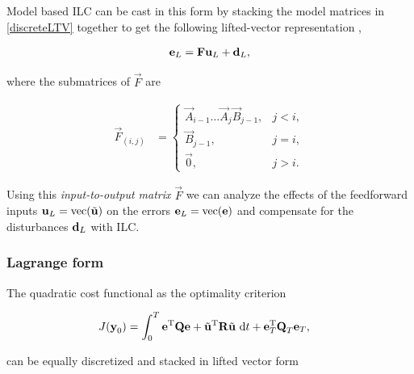\noindent Model based ILC can be cast in this form by stacking the model matrices in \eqref{discreteLTV} together to get the following lifted-vector representation \cite{Bristow06}, \cite{Schoellig12}

\begin{equation}
\begin{aligned}
\boldsymbol{\mathrm{e}}_L &= \boldsymbol{\mathrm{F}}\boldsymbol{\mathrm{u}}_L + \boldsymbol{\mathrm{d}}_L, \\
\end{aligned}
\label{liftedLTV}
\end{equation}

\noindent where the submatrices of $\vec{F}$ are

\begin{equation*}
\begin{aligned}
\vec{F}_{(i,j)} &= \left \{
\begin{array}{cc}
\vec{A}_{i-1}\ldots \vec{A}_j \vec{B}_{j-1}, & j < i, \\ 
\vec{B}_{j-1}, & j = i, \\
\vec{0}, & j > i. 
\end{array} \right.
\end{aligned}
\end{equation*}

\noindent Using this \emph{input-to-output matrix} $\vec{F}$ we can analyze the effects of the feedforward inputs $\boldsymbol{\mathrm{u}}_L = \operatorname{vec}(\tilde{\boldsymbol{\mathrm{u}}})$ on the errors $\boldsymbol{\mathrm{e}}_L = \operatorname{vec}(\boldsymbol{\mathrm{e}})$ and compensate for the disturbances $\boldsymbol{\mathrm{d}}_L$ with ILC.


\subsubsection{Lagrange form} The quadratic cost functional as the optimality criterion

\begin{equation}
\begin{aligned}
J(\boldsymbol{\mathrm{y}}_0) &= \int_{0}^{T} \boldsymbol{\mathrm{e}}^{\mathrm{T}}\boldsymbol{\mathrm{Q}}\boldsymbol{\mathrm{e}} + \tilde{\boldsymbol{\mathrm{u}}}^{\mathrm{T}}\boldsymbol{\mathrm{R}}\tilde{\boldsymbol{\mathrm{u}}} \ \mathrm{d}t + \boldsymbol{\mathrm{e}}_{T}^{\mathrm{T}}\boldsymbol{\mathrm{Q}}_{T}\boldsymbol{\mathrm{e}}_{T},
\end{aligned}
\label{cost}
\end{equation}

\noindent can be equally discretized and stacked in lifted vector form

